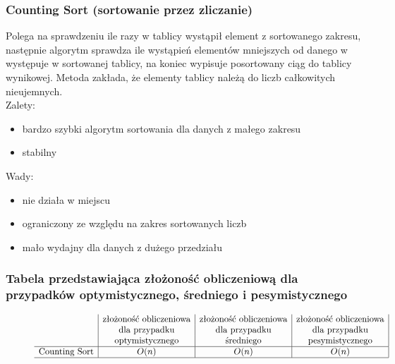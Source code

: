 \documentclass[polish,polish,a4paper]{article}
\begin{document}
\begin{spacing}{1.5}
			\subsubsection*{Counting Sort (sortowanie przez zliczanie)}
			
			Polega na sprawdzeniu ile razy w tablicy wystąpił element z sortowanego zakresu, następnie algorytm sprawdza ile wystąpień elementów mniejszych od danego w występuje w sortowanej tablicy, na koniec wypisuje posortowany ciąg do tablicy wynikowej. Metoda zakłada, że elementy tablicy należą do liczb całkowitych nieujemnych.\\
			
Zalety:
\begin{itemize}
	\item bardzo szybki algorytm sortowania dla danych z małego zakresu
	\item stabilny
\end{itemize}
Wady:
\begin{itemize}
	\item nie działa w miejscu
	\item ograniczony ze względu na zakres sortowanych liczb
	\item mało wydajny dla danych z dużego przedziału
\end{itemize}


\subsubsection*{Tabela przedstawiająca złożoność obliczeniową dla przypadków optymistycznego, średniego i pesymistycznego} 
\begin{figure}[H]
	
	\begin{equation*}
	\begin{array}{l|c|c|c|}

	&$złożoność obliczeniowa$&$złożoność obliczeniowa$&$złożoność obliczeniowa$\\
	&$dla przypadku$&$dla przypadku$&$dla przypadku$\\
	&$optymistycznego$&$średniego$&$pesymistycznego$\\
	\hline
	$Counting Sort$&O(n)&O(n)&O(n)\\
	\hline
	\end{array}
	\end{equation*}
\end{figure}


\end{spacing}
\end{document}
